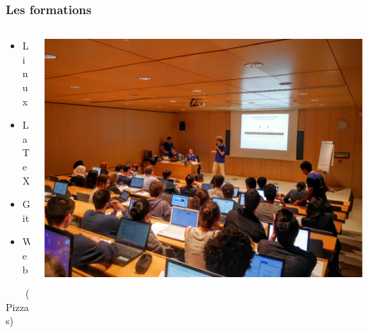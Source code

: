 \documentclass[14pt]{beamer}
\begin{document}
\begin{frame}
    \frametitle{Les formations}
    \begin{columns}
        \begin{column}{.3\textwidth}
        \begin{itemize}
            \item Linux
            \item \LaTeX
            \item Git
            \item Web
        \end{itemize}
        ~~~~(Pizzas)
        \end{column}
        \begin{column}{.7\textwidth}
        \includegraphics[width=\textwidth]{formations.jpg}
        \end{column}
  \end{columns}
\end{frame}
\end{document}
